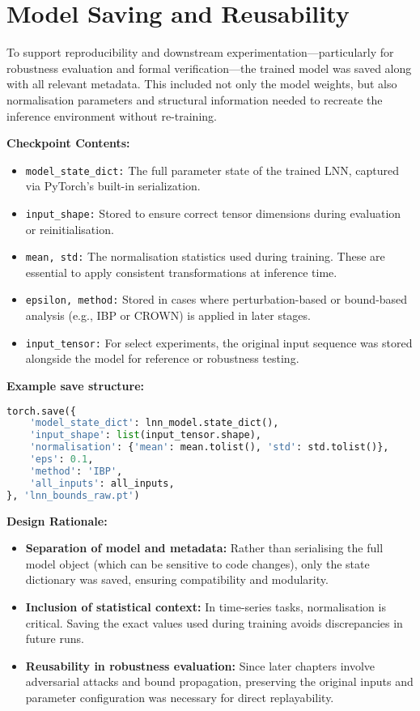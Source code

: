 
\section{Model Saving and Reusability}
To support reproducibility and downstream experimentation—particularly for robustness evaluation and formal verification—the trained model was saved along with all relevant metadata. This included not only the model weights, but also normalisation parameters and structural information needed to recreate the inference environment without re-training.

\vspace{1em}
\noindent \textbf{Checkpoint Contents:}
\begin{itemize}
    \item \texttt{model\_state\_dict:} The full parameter state of the trained LNN, captured via PyTorch’s built-in serialization.
    \item \texttt{input\_shape:} Stored to ensure correct tensor dimensions during evaluation or reinitialisation.
    \item \texttt{mean, std:} The normalisation statistics used during training. These are essential to apply consistent transformations at inference time.
    \item \texttt{epsilon, method:} Stored in cases where perturbation-based or bound-based analysis (e.g., IBP or CROWN) is applied in later stages.
    \item \texttt{input\_tensor:} For select experiments, the original input sequence was stored alongside the model for reference or robustness testing.
\end{itemize}

\vspace{0.5em}
\noindent \textbf{Example save structure:}
\begin{lstlisting}[language=Python, caption={Saving trained LNN model and metadata}]
torch.save({
    'model_state_dict': lnn_model.state_dict(),
    'input_shape': list(input_tensor.shape),
    'normalisation': {'mean': mean.tolist(), 'std': std.tolist()},
    'eps': 0.1,
    'method': 'IBP',
    'all_inputs': all_inputs,
}, 'lnn_bounds_raw.pt')
\end{lstlisting}

\vspace{1em}
\noindent \textbf{Design Rationale:}
\begin{itemize}
    \item \textbf{Separation of model and metadata:} Rather than serialising the full model object (which can be sensitive to code changes), only the state dictionary was saved, ensuring compatibility and modularity.
    \item \textbf{Inclusion of statistical context:} In time-series tasks, normalisation is critical. Saving the exact values used during training avoids discrepancies in future runs.
    \item \textbf{Reusability in robustness evaluation:} Since later chapters involve adversarial attacks and bound propagation, preserving the original inputs and parameter configuration was necessary for direct replayability.
\end{itemize}

